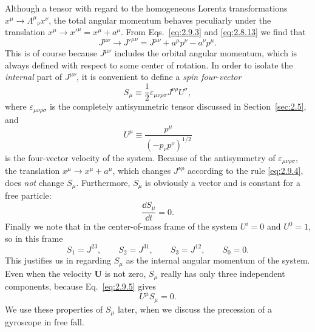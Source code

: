 Although a tensor with regard to the homogeneous Lorentz transformations
\(x^\mu\to\Lambda^\mu{}_\nu x^\nu\), the total angular momentum behaves
peculiarly under the translation \(x^\mu\to x'^\mu=x^\mu+a^\mu\). From
Eqs.~\eqref{eq:2.9.3} and \eqref{eq:2.8.13} we find that
\begin{equation}
  J^{\mu\nu}\longrightarrow J'^{\mu\nu}
  =J^{\mu\nu}+a^\mu p^\nu-a^\nu p^\mu .
  \tag{2.9.4}\label{eq:2.9.4}
\end{equation}
This is of course because \(J^{\mu\nu}\) includes the orbital angular momentum,
which is always defined with respect to some center of rotation. In order to
isolate the \emph{internal} part of \(J^{\mu\nu}\), it is convenient to define
a \emph{spin four-vector}
\begin{equation}
  S_\mu\equiv\frac12\varepsilon_{\mu\nu\rho\sigma}
  J^{\nu\rho}U^\sigma ,
  \tag{2.9.5}\label{eq:2.9.5}
\end{equation}
where \(\varepsilon_{\mu\nu\rho\sigma}\) is the completely antisymmetric tensor
discussed in Section~\ref{sec:2.5}, and
\[
  U^\mu\equiv\frac{p^\mu}{(-p_\nu p^\nu)^{1/2}}
\]
is the four-vector velocity of the system. Because of the antisymmetry of
\(\varepsilon_{\mu\nu\rho\sigma}\), the translation
\(x^\mu\to x^\mu+a^\mu\), which changes \(J^{\nu\rho}\) according to the
rule \eqref{eq:2.9.4}, does \emph{not} change \(S_\mu\). Furthermore,
\(S_\mu\) is obviously a vector and is constant for a free particle:
\begin{equation}
  \frac{\dd S_\mu}{\dd t}=0 .
  \tag{2.9.6}\label{eq:2.9.6}
\end{equation}
Finally we note that in the center-of-mass frame of the system
\(U^i=0\) and \(U^0=1\), so in this frame
\begin{equation}
  S_1=J^{23},\qquad S_2=J^{31},\qquad
  S_3=J^{12},\qquad S_0=0 .
  \tag{2.9.7}\label{eq:2.9.7}
\end{equation}
This justifies us in regarding \(S_\mu\) as the internal angular momentum of
the system. Even when the velocity \(\mathbf U\) is not zero, \(S_\mu\) really
has only three independent components, because Eq.~\eqref{eq:2.9.5} gives
\begin{equation}
  U^\mu S_\mu=0 .
  \tag{2.9.8}\label{eq:2.9.8}
\end{equation}
We use these properties of \(S_\mu\) later, when we discuss the precession of
a gyroscope in free fall.
